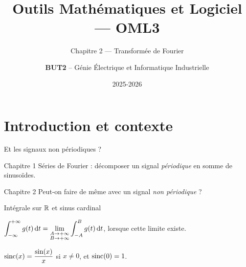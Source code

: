 \documentclass[aspectratio=43,10pt]{beamer}
\title{Outils Mathématiques et Logiciel --- OML3}
\subtitle{Chapitre 2 --- Transformée de Fourier}
\author{\textbf{BUT2} -- Génie Électrique et Informatique Industrielle}
\date{2025-2026}
\newcommand{\highlight}[1]{{\color{niceblue}\emph{#1}}}
\newcommand{\slidefig}[2]{%
\begin{center}
\resizebox{#1}{!}{}
\end{center}
}
\begin{document}

\maketitle


\section{Introduction et contexte}

\begin{frame}{Et les signaux non périodiques ?}
    \begin{block}{Chapitre 1}
        Séries de Fourier : décomposer un signal \highlight{périodique}
        en somme de sinusoïdes.
    \end{block}
    \begin{block}{Chapitre 2}
        Peut-on faire de même avec un signal \highlight{non périodique}  ?
        \slidefig{0.6\textwidth}{context-signal-example.tex}
        \begin{alertblock}{}
        \end{alertblock}
    \end{block}
\end{frame}

\begin{frame}{Intégrale sur ${\mathbb{R}}$ et sinus cardinal}
    \begin{definition}
        $\displaystyle\int_{-\infty}^{+\infty} g(t)\,{\rm d} t = \lim_{\substack{A\to+\infty\\B\to+\infty}} \int_{-A}^{B} g(t)\,{\rm d} t$,
        lorsque cette limite existe.
    \end{definition}
    \begin{definition}
        $\operatorname{sinc}(x) = \dfrac{\sin(x)}{x}$ si $x\neq0$, et $\operatorname{sinc}(0)=1$.
    \end{definition}
    \slidefig{0.55\textwidth}{sinc-def.tex}
\end{frame}
\end{document}
